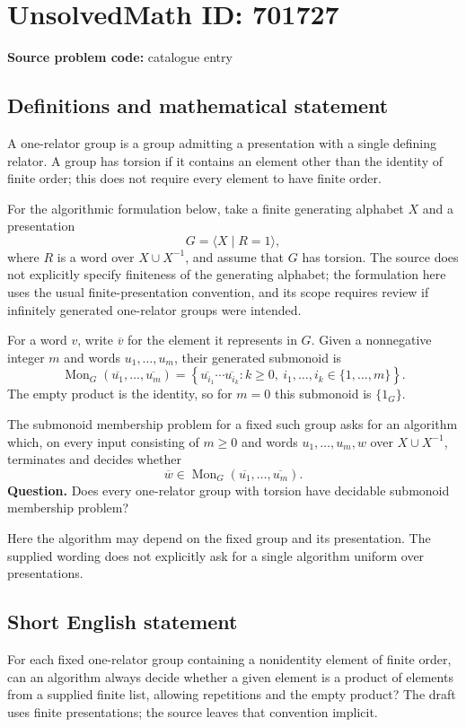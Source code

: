 \documentclass[11pt]{article}
\begin{document}
\section*{UnsolvedMath ID: 701727}
\textbf{Source problem code:} catalogue entry
\subsection{Definitions and mathematical statement}
A one-relator group is a group admitting a presentation with a single defining relator. A group has torsion if it contains an element other than the identity of finite order; this does not require every element to have finite order.

For the algorithmic formulation below, take a finite generating alphabet \(X\) and a presentation
\[
G=\langle X\mid R=1\rangle,
\]
where \(R\) is a word over \(X\cup X^{-1}\), and assume that \(G\) has torsion. The source does not explicitly specify finiteness of the generating alphabet; the formulation here uses the usual finite-presentation convention, and its scope requires review if infinitely generated one-relator groups were intended.

For a word \(v\), write \(\overline v\) for the element it represents in \(G\). Given a nonnegative integer \(m\) and words \(u_1,\ldots,u_m\), their generated submonoid is
\[
\operatorname{Mon}_G(\overline{u_1},\ldots,\overline{u_m})
=
\left\{\overline{u_{i_1}}\cdots\overline{u_{i_k}}:
 k\geq 0,\ i_1,\ldots,i_k\in\{1,\ldots,m\}\right\}.
\]
The empty product is the identity, so for \(m=0\) this submonoid is \(\{1_G\}\).

The submonoid membership problem for a fixed such group asks for an algorithm which, on every input consisting of \(m\geq0\) and words \(u_1,\ldots,u_m,w\) over \(X\cup X^{-1}\), terminates and decides whether
\[
\overline w\in\operatorname{Mon}_G(\overline{u_1},\ldots,\overline{u_m}).
\]
\textbf{Question.} Does every one-relator group with torsion have decidable submonoid membership problem?

Here the algorithm may depend on the fixed group and its presentation. The supplied wording does not explicitly ask for a single algorithm uniform over presentations.
\subsection{Short English statement}
For each fixed one-relator group containing a nonidentity element of finite order, can an algorithm always decide whether a given element is a product of elements from a supplied finite list, allowing repetitions and the empty product? The draft uses finite presentations; the source leaves that convention implicit.
\end{document}
